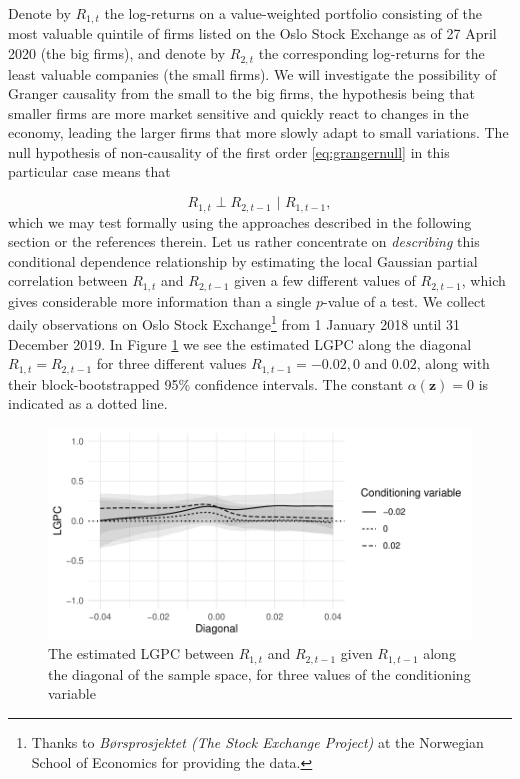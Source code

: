 \documentclass[
  12pt,
  letterpaper]{article}
\newcommand{\z}{\bm{z}}
\theoremstyle{definition}
\theoremstyle{definition}
\theoremstyle{definition}
\theoremstyle{remark}
\begin{document}
Denote by \(R_{1,t}\) the log-returns on a value-weighted portfolio consisting of the most valuable quintile of firms listed on the Oslo Stock Exchange as of 27 April 2020 (the big firms), and denote by \(R_{2,t}\) the corresponding log-returns for the least valuable companies (the small firms). We will investigate the possibility of Granger causality from the small to the big firms, the hypothesis being that smaller firms are more market sensitive and quickly react to changes in the economy, leading the larger firms that more slowly adapt to small variations. The null hypothesis of non-causality of the first order \eqref{eq:grangernull} in this particular case means that

\begin{equation}
R_{1,t} \perp R_{2, t-1} \,\,|\,\, R_{1,t-1},
\end{equation}
which we may test formally using the approaches described in the following section or the references therein. Let us rather concentrate on \emph{describing} this conditional dependence relationship by estimating the local Gaussian partial correlation between \(R_{1,t}\) and \(R_{2,t-1}\) given a few different values of \(R_{2,t-1}\), which gives considerable more information than a single \(p\)-value of a test. We collect daily observations on Oslo Stock Exchange\footnote{Thanks to \emph{Børsprosjektet (The Stock Exchange Project)} at the Norwegian School of Economics for providing the data.} from 1 January 2018 until 31 December 2019. In Figure \ref{fig:order1} we see the estimated LGPC along the diagonal \(R_{1,t} = R_{2,t-1}\) for three different values \(R_{1,t-1} = -0.02, 0\) and \(0.02\), along with their block-bootstrapped 95\% confidence intervals. The constant \(\alpha(\z) = 0\) is indicated as a dotted line.

\begin{figure}[t]
\centering
\includegraphics{rcode_and_data/figures/granger-order1}
\caption{The estimated LGPC between $R_{1,t}$ and $R_{2,t-1}$ given $R_{1,t-1}$ along the diagonal of the sample space, for three values of the conditioning variable}
\label{fig:order1}
\end{figure}
\end{document}
